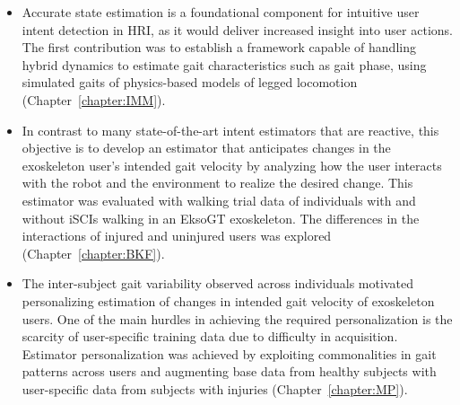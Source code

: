 \begin{itemize}
	\item Accurate state estimation is a foundational component for intuitive user intent detection in HRI, as it would deliver increased insight into user actions. The first contribution was to establish a framework capable of handling hybrid dynamics to estimate gait characteristics such as gait phase, using simulated gaits of physics-based models of legged locomotion (Chapter~\ref{chapter:IMM}).
	\item In contrast to many state-of-the-art intent estimators that are reactive, this objective is to develop an estimator that anticipates changes in the exoskeleton user’s intended gait velocity by analyzing how the user interacts with the robot and the environment to realize the desired change. This estimator was evaluated with walking trial data of	individuals with and without iSCIs walking in an EksoGT exoskeleton. The differences in the interactions of injured and uninjured users was explored (Chapter~\ref{chapter:BKF}).
	\item The inter-subject gait variability observed across individuals motivated personalizing estimation of changes in intended gait velocity of exoskeleton users. One of the main hurdles in achieving the required personalization is the scarcity of user-specific training data due to difficulty in acquisition. Estimator personalization was achieved by exploiting commonalities in gait patterns across users and augmenting base data from healthy subjects with user-specific data from subjects with injuries (Chapter~\ref{chapter:MP}).
\end{itemize}